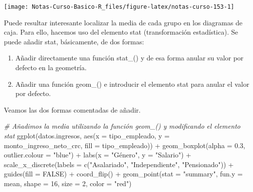 \documentclass[
  12pt,
]{book}
\newenvironment{Shaded}{\begin{snugshade}}{\end{snugshade}}
\newcommand{\AttributeTok}[1]{\textcolor[rgb]{0.77,0.63,0.00}{#1}}
\newcommand{\CommentTok}[1]{\textcolor[rgb]{0.56,0.35,0.01}{\textit{#1}}}
\newcommand{\ConstantTok}[1]{\textcolor[rgb]{0.00,0.00,0.00}{#1}}
\newcommand{\DecValTok}[1]{\textcolor[rgb]{0.00,0.00,0.81}{#1}}
\newcommand{\FloatTok}[1]{\textcolor[rgb]{0.00,0.00,0.81}{#1}}
\newcommand{\FunctionTok}[1]{\textcolor[rgb]{0.00,0.00,0.00}{#1}}
\newcommand{\NormalTok}[1]{#1}
\newcommand{\SpecialCharTok}[1]{\textcolor[rgb]{0.00,0.00,0.00}{#1}}
\newcommand{\StringTok}[1]{\textcolor[rgb]{0.31,0.60,0.02}{#1}}
\providecommand{\tightlist}{%
  \setlength{\itemsep}{0pt}\setlength{\parskip}{0pt}}
\begin{document}
\begin{center}\texttt{[image: Notas-Curso-Basico-R\_files/figure-latex/notas-curso-153-1]} \end{center}

Puede resultar interesante localizar la media de cada grupo en los diagramas de caja. Para ello, hacemos uso del elemento stat (transformación estadística). Se puede añadir stat, básicamente, de dos formas:

\begin{enumerate}
\def\labelenumi{\arabic{enumi}.}
\tightlist
\item
  Añadir directamente una función stat\_() y de esa forma anular su valor por defecto en la geometría.
\item
  Añadir una función geom\_() e introducir el elemento stat para anular el valor por defecto.
\end{enumerate}

Veamos las dos formas comentadas de añadir.

\begin{Shaded}
\begin{Highlighting}[]
\CommentTok{\# Añadimos la media utilizando la función geom\_() y modificando el elemento stat}
\FunctionTok{ggplot}\NormalTok{(datos.ingresos, }\FunctionTok{aes}\NormalTok{(}\AttributeTok{x =}\NormalTok{ tipo\_empleado, }\AttributeTok{y =}\NormalTok{ monto\_ingreso\_neto\_crc, }\AttributeTok{fill =}\NormalTok{ tipo\_empleado)) }\SpecialCharTok{+}
  \FunctionTok{geom\_boxplot}\NormalTok{(}\AttributeTok{alpha =} \FloatTok{0.3}\NormalTok{, }\AttributeTok{outlier.colour =} \StringTok{"blue"}\NormalTok{) }\SpecialCharTok{+}
  \FunctionTok{labs}\NormalTok{(}\AttributeTok{x =} \StringTok{"Género"}\NormalTok{, }\AttributeTok{y =} \StringTok{"Salario"}\NormalTok{) }\SpecialCharTok{+}
  \FunctionTok{scale\_x\_discrete}\NormalTok{(}\AttributeTok{labels =} \FunctionTok{c}\NormalTok{(}\StringTok{"Asalariado"}\NormalTok{, }\StringTok{"Independiente"}\NormalTok{, }\StringTok{"Pensionado"}\NormalTok{)) }\SpecialCharTok{+}
  \FunctionTok{guides}\NormalTok{(}\AttributeTok{fill =} \ConstantTok{FALSE}\NormalTok{) }\SpecialCharTok{+}
  \FunctionTok{coord\_flip}\NormalTok{() }\SpecialCharTok{+}
  \FunctionTok{geom\_point}\NormalTok{(}\AttributeTok{stat =} \StringTok{"summary"}\NormalTok{, }\AttributeTok{fun.y =}\NormalTok{ mean, }\AttributeTok{shape =} \DecValTok{16}\NormalTok{, }\AttributeTok{size =} \DecValTok{2}\NormalTok{, }\AttributeTok{color =} \StringTok{"red"}\NormalTok{)}
\end{Highlighting}
\end{Shaded}
\end{document}
